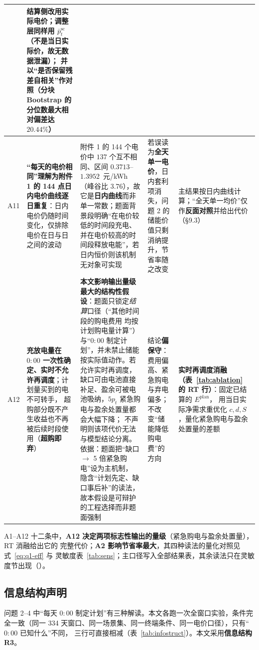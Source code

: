\begin{table}[htbp]
\begin{tabularx}{\linewidth}{C{0.62cm} L{2.65cm} L{4.30cm} L{1.95cm} Y}
      & 结算侧改用实际电价；\textbf{调整层同样用 \(\bar p^{\text{sc}}_t\)（不是当日实际价，故无数据泄漏）}；
        并以“是否保留残差自相关”作对照（分块 Bootstrap 的分位数最大相对偏差达 \(20.44\%\)） \\
    \midrule
    A11 & \textbf{“每天的电价相同”理解为附件 1 的 144 点日内电价曲线逐日重复}：日内电价仍随时间
         变化，仅排除电价在日与日之间的波动
      & 附件 1 的 144 个电价中 \(137\) 个互不相同、区间 \(0.3713\)--\(1.3952\)~元/kWh（峰谷比
        \(3.76\)），故它是\textbf{日内曲线}而非单一常数；题面背景段明确“在电价较低的时间段充电、
        并在电价较高的时间段释放电能”，若日内恒价则该机制无对象可实现
      & 若误读为\textbf{全天单一电价}，日内套利项消失，问题 2 的储能价值只剩消纳提升，节省率随之改变
      & 主结果按日内曲线计算；“全天单一均价”仅作\textbf{反面对照}并给出代价（\S9.3） \\
    \midrule
    A12 & \textbf{充放电量在 \(0{:}00\) 一次性确定、实时不允许再调度}；计划量买到的电不可转手，
          超购部分既不产生收益也不再被后续时段使用（\textbf{超购即弃}）
      & \textbf{本文影响输出量级最大的结构性假设}：题面只锁定\emph{结算}口径（“其他时间段的购电费用
        均按计划购电量计算”）与“\(0{:}00\) 制定计划”，并未禁止储能按实际值动作。若允许实时再调度，
        缺口可由电池直接补足、盈余可被电池吸纳，\(5p_t\) 紧急购电与盈余处置量都会大幅下降；
        不声明则该项代价无法与模型结论分离。依据：题面把“缺口 \(\to\) 5 倍紧急购电”设为主机制，
        隐含“计划先定、缺口事后补”的读法，故本假设是可辩护的工程选择而非题面强制
      & 结论\textbf{偏保守}：费用偏高、紧急购电与弃电偏多；不改变“储能降低购电费”的方向
      & \textbf{实时再调度消融（表~\ref{tab:ablation} 的 RT 行）}：固定已结算的 \(E^{\text{plan}}\)，
        用当日实际净需求重优化 \(c,d,S\)，量化紧急购电与盈余处置量的差额 \\
    \bottomrule
  \end{tabularx}
\end{table}

A1--A12 十二条中，\textbf{A12 决定两项标志性输出的量级}（紧急购电与盈余处置量），RT 消融给出它的
完整代价；\textbf{A2 影响节省率最大}，其四种读法的量化对照见式~\eqref{eq:q1-eff} 与
灵敏度表~\ref{tab:sens}；主口径写入全部结果表，其余读法只在灵敏度节出现（）。

\subsection{信息结构声明}

问题 2--4 中“每天 \(0{:}00\) 制定计划”有三种解读。本文各跑一次全窗口实验，条件完全一致（同一
334 天窗口、同一场景集、同一终端条件、同一电价口径），只有“\(0{:}00\) 已知什么”不同，
三行可直接相减（表~\ref{tab:infostruct}）。本文采用\textbf{信息结构 R3}。

